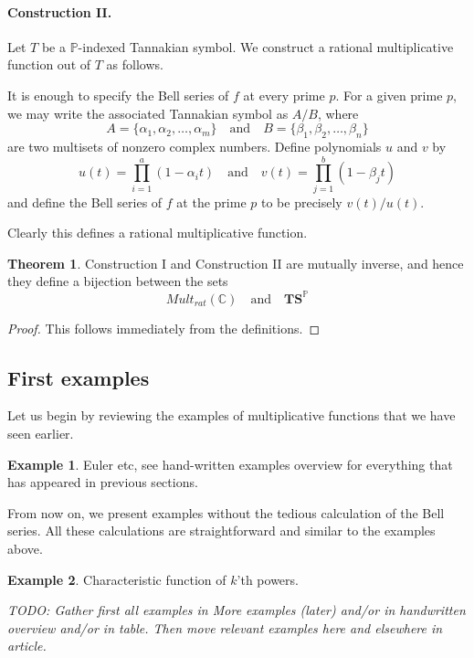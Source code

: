 \documentclass[a4paper]{article}
\theoremstyle{definition}
\newtheorem{theorem}{Theorem}[section]
\newtheorem{example}{Example}[section]
\theoremstyle{remark}
\newcommand{\C}{\mathbb{C}}
\newcommand{\TS}{\mathbf{TS}}
\begin{document}
\paragraph{Construction II.} Let $T$ be a $\mathbb{P}$-indexed Tannakian symbol. We construct a rational multiplicative function out of $T$ as follows.

It is enough to specify the Bell series of $f$ at every prime $p$. For a given prime $p$, we may write the associated Tannakian symbol as $A/B$, where 
$$ A = \{ \alpha_1, \alpha_2, \ldots, \alpha_m \} \quad \mathrm{and} \quad B =  \{ \beta_1, \beta_2, \ldots, \beta_n \}$$
are two multisets of nonzero complex numbers. Define polynomials $u$ and $v$ by 
$$ u(t) = \prod_{i=1}^a (1-{\alpha_i}t) \quad \mathrm{and} \quad v(t) = \prod_{j=1}^b (1-{\beta_j}t)$$
and define the Bell series of $f$ at the prime $p$ to be precisely $v(t) / u(t)$. 

Clearly this defines a rational multiplicative function.


\begin{theorem}
Construction I and Construction II are mutually inverse, and hence they define a bijection between the sets
$$   Mult_{rat}(\C) \quad \textrm{and}  \quad  \TS^{\mathbb{P}} $$
\end{theorem}
\begin{proof}
This follows immediately from the definitions.
\end{proof}

\subsection{First examples}

Let us begin by reviewing the examples of multiplicative functions that we have seen earlier.

\begin{example}
Euler etc, see hand-written examples overview for everything that has appeared in previous sections.
\end{example}

From now on, we present examples without the tedious calculation of the Bell series. All these calculations are straightforward and similar to the examples above.

\begin{example}
Characteristic function of $k$'th powers.
\end{example}


\emph{TODO: Gather first all examples in More examples (later) and/or in handwritten overview and/or in table. Then move relevant examples here and elsewhere in article.}
\end{document}
